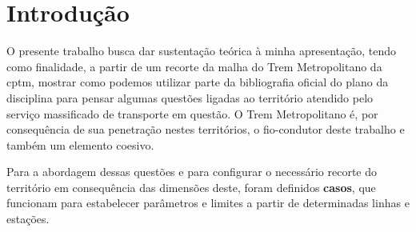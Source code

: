 	
	
	
	
	
	\tableofcontents 
	\textual
	
	\chapter{Introdução}
	
	O presente trabalho busca dar sustentação teórica à minha apresentação, tendo como finalidade, a partir de um recorte da malha do Trem Metropolitano da \gls{cptm}, mostrar como podemos utilizar parte da bibliografia oficial do plano da disciplina para pensar algumas questões ligadas ao território atendido pelo serviço massificado de transporte em questão. O Trem Metropolitano é, por consequência de sua penetração nestes territórios, o fio-condutor deste trabalho e também um elemento coesivo.
	
	Para a abordagem dessas questões e para configurar o necessário recorte do território em consequência das dimensões deste, foram definidos \textbf{casos}, que funcionam para estabelecer parâmetros e limites a partir de determinadas linhas e estações.
	

